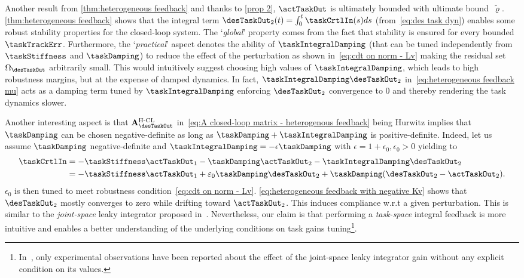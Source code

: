 Another result from \cref{thm:heterogeneous feedback} and  thanks to \cref{prop 2}, $\actTaskOut $ is ultimately bounded with ultimate bound~$\tilde{\varrho}$. 
\cref{thm:heterogeneous feedback} shows that the integral term $\desTaskOut_2(t) = \int_{0}^{t}\taskCrtlIn(s)ds$ (from~\cref{eq:des task dyn}) enables some robust stability properties for the closed-loop system.  The ‘\emph{global}’ property  comes from the fact that stability is ensured for every bounded $\taskTrackErr $.  %
Furthermore, the ‘\emph{practical}’ aspect denotes the ability of $\taskIntegralDamping$ (that can be tuned independently from $\taskStiffness$ and $\taskDamping$) to reduce the effect of the perturbation as shown in~\cref{eq:cdt on norm - Lv} making the residual set $\Omega_\desTaskOut$  arbitrarily small. This would intuitively suggest choosing high values of $\taskIntegralDamping$, which leads to high robustness margins, but at the expense of damped dynamics. In fact, $\taskIntegralDamping\desTaskOut_2$ in~\cref{eq:heterogeneous feedback mu} acts as a damping term tuned by $\taskIntegralDamping$ enforcing $\desTaskOut_2$ convergence to $0$ and thereby rendering the task dynamics slower. 

Another interesting aspect is that  $\mathbf{A}^{\text{H-CL}}_\desTaskOut$ in~\cref{eq:A closed-loop matrix - heterogenous feedback} being Hurwitz  implies that  $\taskDamping$ can be chosen negative-definite as long as   $\taskDamping+\taskIntegralDamping$ is positive-definite. Indeed, let us assume  $\taskDamping$ negative-definite and $\taskIntegralDamping  = -\epsilon\taskDamping$ with $\epsilon = 1 +\epsilon_0, \epsilon_0>0$ yielding to 
\begin{align}\label{eq:heterogeneous feedback with negative Kv}
	\begin{split}
		\taskCrtlIn &= -\taskStiffness\actTaskOut_1  -\taskDamping\actTaskOut_2 - \taskIntegralDamping\desTaskOut_2 \\
		&= -\taskStiffness\actTaskOut_1  +{\varepsilon_0}\taskDamping\desTaskOut_2 + \taskDamping(\desTaskOut_2- \actTaskOut_2).
	\end{split}		
\end{align}
$\epsilon_0$ is then tuned to meet robustness condition~\cref{eq:cdt on norm - Lv}. \cref{eq:heterogeneous feedback with negative Kv} shows that $\desTaskOut_2$ mostly converges to zero while drifting toward $\actTaskOut_2$. This induces compliance w.r.t a given perturbation. This is similar to the \emph{joint-space} leaky integrator proposed in~\cite{hopkins2015icra}. Nevertheless, our claim is that performing a  \emph{task-space} integral feedback is more intuitive and enables a better understanding of the underlying conditions on task gains tuning\footnote{In~\cite{hopkins2015icra}, only experimental observations have been reported about the effect of the joint-space leaky integrator gain without any explicit condition on its values.}. 

